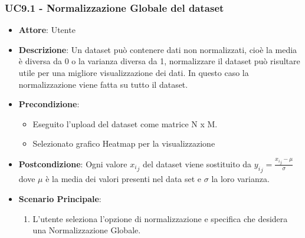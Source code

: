     \subsubsection{UC9.1 - Normalizzazione Globale del dataset}
    \label{uc9.1}
    \begin{itemize}
    \item \textbf{Attore}: Utente
    \item \textbf{Descrizione}: Un dataset può contenere dati non normalizzati, cioè la media è diversa da 0 o la varianza diversa da 1, normalizzare il dataset può risultare utile per una migliore visualizzazione dei dati.
    In questo caso la normalizzazione viene fatta su tutto il dataset.
    \item \textbf{Precondizione}: 
    \begin{itemize}
        \item Eseguito l'upload del dataset come matrice N x M.
        \item Selezionato grafico Heatmap per la visualizzazione
    \end{itemize}  
    \item \textbf{Postcondizione}:  Ogni valore \({x_i}_j\) del dataset viene sostituito da \( {y_i}_j = \frac{{x_i}_j - \mu}{\sigma}\) dove \(\mu\) è la media dei valori presenti nel data set e \(\sigma\) la loro varianza.
    \item \textbf{Scenario Principale}: 
    \begin{enumerate}
        \item L'utente seleziona l'opzione di normalizzazione e specifica che desidera una Normalizzazione Globale.
    \end{enumerate}  
    \end{itemize}
    
